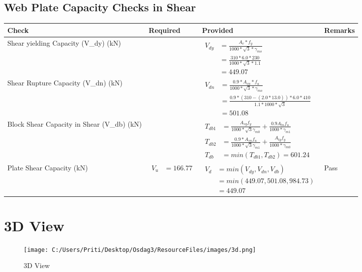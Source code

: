 \documentclass{article}%
\begin{document}
\subsection{Web Plate Capacity Checks in Shear}%
\label{subsec:WebPlateCapacityChecksinShear}%
\renewcommand{\arraystretch}{1.2}%
\begin{longtable}{|p{4cm}|p{6cm}|p{5.5cm}|p{1.5cm}|}%
\hline%
\rowcolor{OsdagGreen}%
Check&Required&Provided&Remarks\\%
\hline%
\endhead%
\hline%
Shear yielding Capacity (V\_dy) (kN)&&$\begin{aligned} V_{dy} &= \frac{A_v*f_y}{1000*\sqrt{3}*\gamma_{mo}}\\ &=\frac{310*6.0*230}{1000*\sqrt{3}*1.1}\\ &=449.07\end{aligned}$&\\%
\hline%
Shear Rupture Capacity (V\_dn) (kN)&&$\begin{aligned} V_{dn} &= \frac{0.9*A_{vn}*f_u}{1000*\sqrt{3}*\gamma_{mo}}\\ &= \frac{0.9 *(310-(2.0*13.0))*6.0*410}{1.1 *1000*\sqrt{3}}\\ &=501.08\end{aligned}$&\\%
\hline%
Block Shear Capacity in Shear (V\_db) (kN)&&$\begin{aligned}T_{db1} &= \frac{A_{vg} f_{y}}{1000*\sqrt{3} \gamma_{m0}} + \frac{0.9 A_{tn} f_{u}}{1000*\gamma_{m1}}\\ T_{db2} &= \frac{0.9*A_{vn} f_{u}}{1000*\sqrt{3} \gamma_{m1}} + \frac{A_{tg} f_{y}}{1000*\gamma_{m0}}\\ T_{db} &= min(T_{db1}, T_{db2})= 601.24\end{aligned}$&\\%
\hline%
Plate Shear Capacity (kN)&$\begin{aligned} V_u &=166.77 \end{aligned}$&$\begin{aligned} V_d &= min(V_{dy},V_{dn},V_{db})\\ &= min(449.07,501.08,984.73)\\ &=449.07\end{aligned}$&Pass\\%
\hline%
\end{longtable}

%
%
\newpage%
\section{3D View}%
\label{sec:3DView}%


\begin{figure}[h!]%
\centering%
\texttt{[image: C:/Users/Priti/Desktop/Osdag3/ResourceFiles/images/3d.png]}%
\caption{3D View}%
\end{figure}

%
\end{document}
